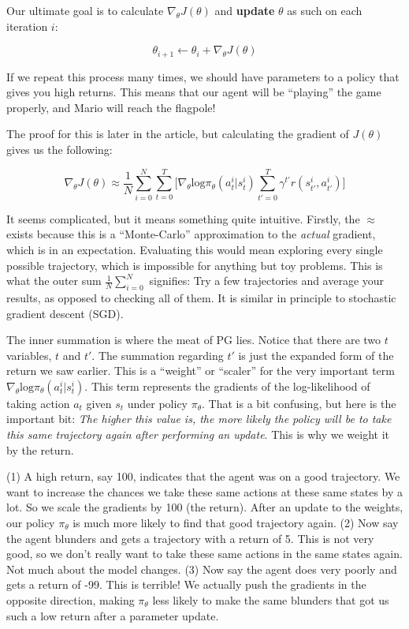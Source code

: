     Our ultimate goal is to calculate $\nabla_\theta J(\theta)$ and \textbf{update} $\theta$ as such on each iteration $i$:

    $$\theta_{i+1} \leftarrow \theta_i + \nabla_\theta J(\theta)$$

    If we repeat this process many times, we should have parameters to a policy that gives you high returns. This means that our agent will be ``playing'' the game properly, and Mario will reach the flagpole! 

    The proof for this is later in the article, but calculating the gradient of $J(\theta)$ gives us the following:

    $$\nabla_\theta J(\theta) \approx \frac{1}{N}\sum_{i=0}^N\sum_{t=0}^T\biggl[ \nabla_\theta \mathrm{log}\pi_\theta(a_t^i|s_t^i)\sum_{t'=0}^T \gamma^{t'} r(s_{t'}^i, a_{t'}^i)\biggr]$$

    It seems complicated, but it means something quite intuitive. Firstly, the $\approx$ exists because this is a ``Monte-Carlo'' approximation to the \textit{actual} gradient, which is in an expectation. Evaluating this would mean exploring every single possible trajectory, which is impossible for anything but toy problems. This is what the outer sum $\frac{1}{N}\sum_{i=0}^N$ signifies: Try a few trajectories and average your results, as opposed to checking all of them. It is similar in principle to stochastic gradient descent (SGD). 

    The inner summation is where the meat of PG lies. Notice that there are two $t$ variables, $t$ and $t'$. The summation regarding $t'$ is just the expanded form of the return we saw earlier. This is a ``weight'' or ``scaler'' for the very important term $\nabla_\theta \mathrm{log}\pi_\theta(a_t^i|s_t^i)$. This term represents the gradients of the log-likelihood of taking action $a_t$ given $s_t$ under policy $\pi_\theta$. That is a bit confusing, but here is the important bit: \textit{The higher this value is, the more likely the policy will be to take this same trajectory again after performing an update}. This is why we weight it by the return. 
    
    (1) A high return, say 100, indicates that the agent was on a good trajectory. We want to increase the chances we take these same actions at these same states by a lot. So we scale the gradients by 100 (the return). After an update to the weights, our policy $\pi_\theta$ is much more likely to find that good trajectory again. (2) Now say the agent blunders and gets a trajectory with a return of 5. This is not very good, so we don't really want to take these same actions in the same states again. Not much about the model changes. (3) Now say the agent does very poorly and gets a return of -99. This is terrible! We actually push the gradients in the opposite direction, making $\pi_\theta$ less likely to make the same blunders that got us such a low return after a parameter update. 

